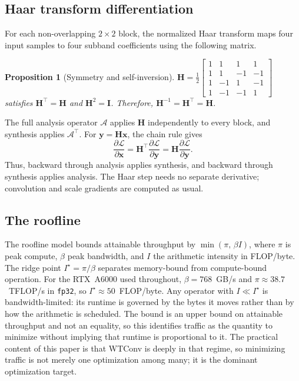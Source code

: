 \documentclass[10pt]{article} %
\newcommand{\mH}{\mathbf{H}}
\newcommand{\Aop}{\mathcal{A}}          %
\theoremstyle{plain}
\newtheorem{proposition}{Proposition}
\begin{document}
\subsection{Haar transform differentiation}
\label{sec:haar-backprop}

For each non-overlapping $2\times2$ block, the normalized Haar transform maps
four input samples to four subband coefficients using the following matrix.

\begin{proposition}[Symmetry and self-inversion]
\label{prop:selfinverse}
$\mH=\tfrac12\left[\begin{smallmatrix}1&1&1&1\\1&1&-1&-1\\1&-1&1&-1\\1&-1&-1&1\end{smallmatrix}\right]$
satisfies $\mH^{\!\top}=\mH$ and $\mH^2=\mathbf{I}$. Therefore,
$\mH^{-1}=\mH^{\!\top}=\mH$.
\end{proposition}

The full analysis operator $\Aop$ applies $\mH$ independently to every block,
and synthesis applies $\Aop^{\!\top}$. For $\mathbf{y}=\mH\mathbf{x}$, the
chain rule gives
\begin{equation}
\frac{\partial\mathcal{L}}{\partial\mathbf{x}}
= \mH^{\!\top}\frac{\partial\mathcal{L}}{\partial\mathbf{y}}
= \mH\frac{\partial\mathcal{L}}{\partial\mathbf{y}}.
\end{equation}
Thus, backward through analysis applies synthesis, and backward through
synthesis applies analysis. The Haar step needs no separate derivative;
convolution and scale gradients are computed as usual.


\subsection{The roofline}
\label{roofline}

The roofline model \citep{williams2009roofline} bounds attainable throughput by $\min(\pi,\, \beta I)$, where $\pi$ is peak compute, $\beta$ peak bandwidth, and $I$ the arithmetic intensity in FLOP/byte. The ridge point $I^\star=\pi/\beta$ separates memory-bound from compute-bound operation. For the RTX~A6000 used throughout, $\beta=768$~GB/s and $\pi\approx38.7$~TFLOP/s in \texttt{fp32}, so $I^\star\approx50$~FLOP/byte. Any operator with $I\ll I^\star$ is bandwidth-limited: its runtime is governed by the bytes it moves rather than by how the arithmetic is scheduled. The bound is an upper bound on attainable throughput and not an equality, so this identifies traffic as the quantity to minimize without implying that runtime is proportional to it. The practical content of this paper is that WTConv is deeply in that regime, so minimizing traffic is not merely one optimization among many; it is the dominant optimization target.
\end{document}
